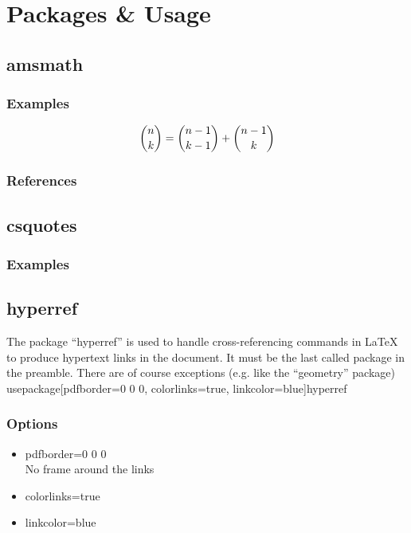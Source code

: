 \chapter{Packages \& Usage}

\section{amsmath}
\subsection{Examples}
$$\dbinom{n}{k} = \dbinom{n-1}{k-1} +\dbinom{n-1}{k}$$
\subsection{References}

\section{csquotes}
\subsection{Examples}

\section{hyperref}
The package \enquote{hyperref} is used to handle cross-referencing commands in
LaTeX to produce hypertext links in the document. It must be the last called
package in the preamble. There are of course exceptions (e.g. like the
\enquote{geometry} package)
\\usepackage[pdfborder={0 0 0}, colorlinks=true, linkcolor=blue]{hyperref}
\subsection{Options}
\begin{itemize}
    \item{pdfborder={0 0 0}\\
        No frame around the links}
    \item{colorlinks=true}
    \item{linkcolor=blue}
\end{itemize}
